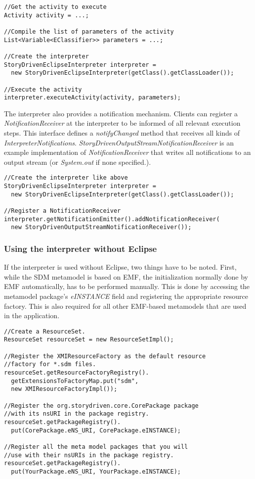 \begin{verbatim}
//Get the activity to execute
Activity activity = ...;

//Compile the list of parameters of the activity
List<Variable<EClassifier>> parameters = ...;

//Create the interpreter
StoryDrivenEclipseInterpreter interpreter = 
  new StoryDrivenEclipseInterpreter(getClass().getClassLoader());
	
//Execute the activity
interpreter.executeActivity(activity, parameters);
\end{verbatim}

The interpreter also provides a notification mechanism. Clients can register a \emph{NotificationReceiver} at the interpreter to be informed of all
relevant execution steps. This interface defines a \emph{notifyChanged} method that receives all kinds of \emph{InterpreterNotifications}.
\emph{StoryDrivenOutputStreamNotificationReceiver} is an example implementation of \emph{NotificationReceiver} that writes all notifications
to an output stream (or \emph{System.out} if none specified.).

\begin{verbatim}
//Create the interpreter like above
StoryDrivenEclipseInterpreter interpreter = 
  new StoryDrivenEclipseInterpreter(getClass().getClassLoader());

//Register a NotificationReceiver
interpreter.getNotificationEmitter().addNotificationReceiver(
  new StoryDrivenOutputStreamNotificationReceiver());
\end{verbatim}

\subsubsection{Using the interpreter without Eclipse}

If the interpreter is used without Eclipse, two things have to be noted. 
First, while the SDM metamodel is based on EMF, the initialization normally done by EMF automatically, has to be performed manually. 
This is done by accessing the metamodel package's \emph{eINSTANCE} field and registering the appropriate resource factory. 
This is also required for all other EMF-based metamodels that are used in the application.

\begin{verbatim}
//Create a ResourceSet.
ResourceSet resourceSet = new ResourceSetImpl();

//Register the XMIResourceFactory as the default resource 
//factory for *.sdm files.
resourceSet.getResourceFactoryRegistry().
  getExtensionsToFactoryMap.put("sdm", 
  new XMIResourceFactoryImpl());

//Register the org.storydriven.core.CorePackage package 
//with its nsURI in the package registry.
resourceSet.getPackageRegistry().
  put(CorePackage.eNS_URI, CorePackage.eINSTANCE);

//Register all the meta model packages that you will 
//use with their nsURIs in the package registry.
resourceSet.getPackageRegistry().
  put(YourPackage.eNS_URI, YourPackage.eINSTANCE);
\end{verbatim}


